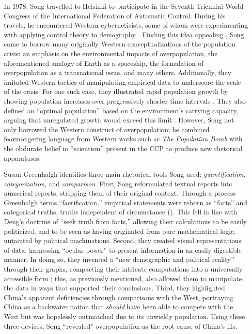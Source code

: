 In 1978, Song travelled to Helsinki to participate in the Seventh Triennial World Congress of the International Federation of Automatic Control. During his travels, he encountered Western cyberneticists, some of whom were experimenting with applying control theory to demography \autocite[p.\ 142]{Bacaer2011}. Finding this idea appealing \autocite[p.\ 144]{Greenhalgh2008JustOneChild}, Song came to borrow many originally Western conceptualizations of the population crisis: an emphasis on the environmental impacts of overpopulation, the aforementioned analogy of Earth as a spaceship, the formulation of overpopulation as a transnational issue, and many others. Additionally, they imitated Western tactics of manipulating empirical data to underscore the scale of the crisis. For one such case, they illustrated rapid population growth by showing population increases over progressively shorter time intervals \autocite[pp.\ 6--7]{Goldsmith1972}. They also defined an “optimal population” based on the environment's carrying capacity, arguing that unregulated growth would exceed this limit \autocite[pp.\ 46--47]{Goldsmith1972}. However, Song not only borrowed the Western construct of overpopulation; he combined fearmongering language from Western works such as \emph{The Population Bomb} with the obdurate belief in “scientism” present in the CCP to produce new rhetorical apparatuses.

Susan Greenhalgh identifies three main rhetorical tools Song used: \emph{quantification}, \emph{categorization}, and \emph{comparison}. First, Song reformulated textual reports into numerical reports, stripping them of their original context. Through a process Greenhalgh terms “faerification,” empirical statements were reborn as “facts” and categorical truths, truths independent of circumstance (\cites[p.\ 109]{Greenhalgh2008JustOneChild}[p.\ 23]{Latour1987}). This fell in line with Deng’s doctrine of “seek truth from facts,” allowing their calculations to be easily politicized, and to be seen as having originated from pure mathematical logic, untainted by political machinations. Second, they created visual representations of data, harnessing “ocular power” to present information in an easily digestible manner. In doing so, they invented a “new demographic and political reality” through their graphs, compacting their intricate computations into a universally accessible form \autocite[p.\ 110]{Greenhalgh2008JustOneChild}; this, as previously mentioned, also allowed them to manipulate the data in ways that supported their conclusions. Third, they highlighted China’s apparent deficiencies through comparisons with the West, portraying China as a backwater nation that \emph{should} have been able to compete with the West but was hopelessly outmatched due to its unwieldy population. Using these three devices, Song “revealed” overpopulation as the root cause of China’s ills.

